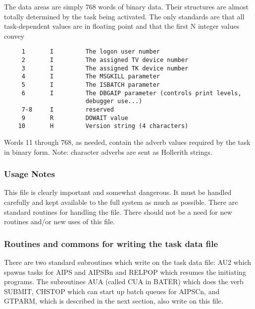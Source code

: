 The data areas are simply 768 words of binary data.  Their structures
are almost totally determined by the task being activated.  The only
standards are that all task-dependent values are in floating point
and that the first N integer values convey
\begin{verbatim}
     1       I         The logon user number
     2       I         The assigned TV device number
     3       I         The assigned TK device number
     4       I         The MSGKILL parameter
     5       I         The ISBATCH parameter
     6       I         The DBGAIP parameter (controls print levels,
                       debugger use...)
     7-8     I         reserved
     9       R         DOWAIT value
    10       H         Version string (4 characters)
\end{verbatim}

Words 11 through 768, as needed, contain the adverb values
required by the task in binary form.  Note: character adverbs are sent
as Hollerith strings.

\subsubsection{Usage Notes}

     This file is clearly important and somewhat dangerous.  It must be
handled carefully and kept available to the full system as much as
possible.  There are standard routines for handling the file.  There
should not be a need for new routines and/or new uses of this file.

\subsubsection{Routines and commons for writing the task data file}

     There are two standard subroutines which write on the task data
file: AU2 which spawns tasks for AIPS and AIPSBn and RELPOP which
resumes the initiating programs.  The subroutines AUA (called CUA in
BATER) which does the verb SUBMIT, CHSTOP which can start up batch
queues for AIPSCn, and GTPARM, which is described in the
next section, also write on this file.

